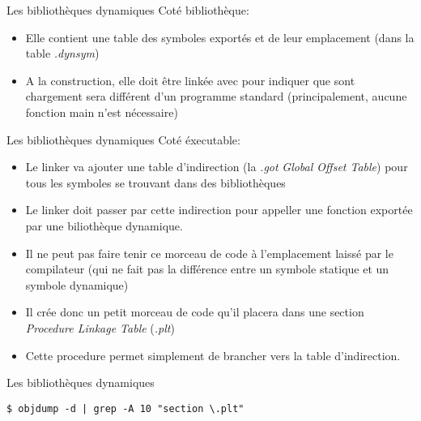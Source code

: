 \begin{frame}[fragile=singleslide]{Les bibliothèques dynamiques}
  Coté bibliothèque:
  \begin{itemize}
  \item  Elle contient  une table  des  symboles exportés  et de  leur
    emplacement (dans la table \emph{.dynsym})
  \item A  la construction, elle  doit être linkée  avec 
    pour indiquer  que sont  chargement sera différent  d'un programme
    standard (principalement, aucune fonction main n'est nécessaire)
  \end{itemize}
\end{frame}

\begin{frame}[fragile=singleslide]{Les bibliothèques dynamiques}
  Coté éxecutable:
  \begin{itemize}
  \item Le  linker va ajouter une table  d'indirection (la \emph{.got}
    \emph{Global  Offset Table})  pour tous  les symboles  se trouvant
    dans des bibliothèques
  \item Le linker doit passer  par cette indirection pour appeller une
    fonction exportée par une biliothèque dynamique.
  \item Il ne peut pas faire  tenir ce morceau de code à l'emplacement
    laissé par le compilateur (qui  ne fait pas la différence entre un
    symbole statique et un symbole dynamique)
  \item Il crée  donc un petit morceau de code  qu'il placera dans une
    section \emph{Procedure Linkage Table} (\emph{.plt})
  \item Cette  procedure permet simplement  de brancher vers  la table
    d'indirection.
  \end{itemize}
\end{frame}

\begin{frame}[fragile=singleslide]{Les bibliothèques dynamiques}
  \begin{center}
\end{center}
\begin{lstlisting}
$ objdump -d | grep -A 10 "section \.plt"
    \end{lstlisting}
\end{frame}

